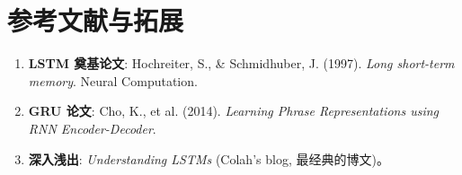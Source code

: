 \documentclass[12pt, a4paper]{article}
\begin{document}
\section{参考文献与拓展}
\begin{enumerate}
    \item \textbf{LSTM 奠基论文}: Hochreiter, S., & Schmidhuber, J. (1997). \textit{Long short-term memory}. Neural Computation.
    \item \textbf{GRU 论文}: Cho, K., et al. (2014). \textit{Learning Phrase Representations using RNN Encoder-Decoder}.
    \item \textbf{深入浅出}: \textit{Understanding LSTMs} (Colah's blog, 最经典的博文)。
\end{enumerate}
\end{document}
